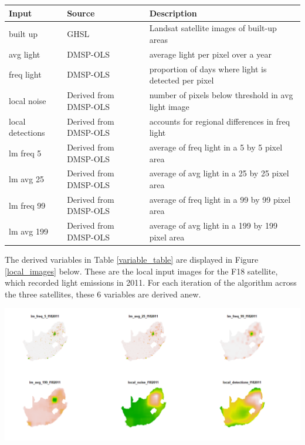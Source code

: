 \documentclass[11pt,preprint, authoryear]{elsarticle}
\let\origfigure\figure
\let\endorigfigure\endfigure
\renewenvironment{figure}[1][2] {
    \expandafter\origfigure\expandafter[H]
} {
    \endorigfigure
}
\let\origtable\table
\let\endorigtable\endtable
\renewenvironment{table}[1][2] {
    \expandafter\origtable\expandafter[H]
} {
    \endorigtable
}
\numberwithin{equation}{section}
\numberwithin{figure}{section}
\numberwithin{table}{section}
\begin{document}
\begin{table}
\begin{center}
\begin{tabular}{ |l|l|l| }
 \hline
 Input & Source & Description  \\
 \hline
  built up & GHSL & Landsat satellite images of built-up areas \\
  avg light & DMSP-OLS & average light per pixel over a year \\
  freq light & DMSP-OLS & proportion of days where light is detected per pixel \\
  local noise & Derived from DMSP-OLS & number of pixels below threshold in avg light image \\
  local detections & Derived from DMSP-OLS & accounts for regional differences in freq light \\
  lm freq 5 & Derived from DMSP-OLS & average of freq light in a 5 by 5 pixel area \\
  lm avg 25 & Derived from DMSP-OLS & average of avg light in a 25 by 25 pixel area \\
  lm freq 99 & Derived from DMSP-OLS & average of freq light in a 99 by 99 pixel area \\
  lm avg 199 & Derived from DMSP-OLS & average of avg light in a 199 by 199 pixel area \\
  \hline
\end{tabular}
\caption{Data Inputs}
\label{variable_table}
\end{center}
\end{table}

The derived variables in Table \ref{variable_table} are displayed in
Figure \ref{local_images} below. These are the local input images for
the F18 satellite, which recorded light emissions in 2011. For each
iteration of the algorithm across the three satellites, these 6
variables are derived anew.

\begin{figure}[H]
\includegraphics[width=1\linewidth]{figures/local_inputs} \caption{\label{local_images} Local Image Inputs}\label{fig:local_images}
\end{figure}
\end{document}

